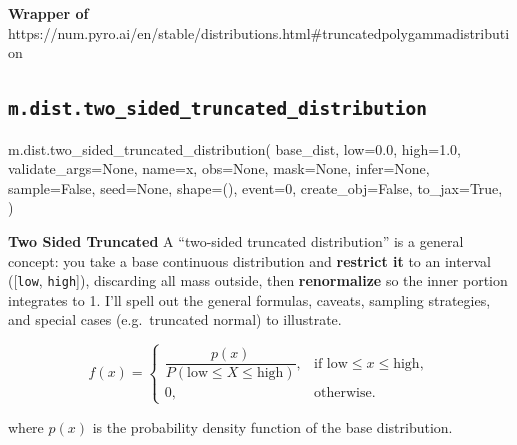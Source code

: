 \documentclass[
  letterpaper,
  DIV=11,
  numbers=noendperiod]{scrartcl}
\newenvironment{Shaded}{\begin{snugshade}}{\end{snugshade}}
\newcommand{\DecValTok}[1]{\textcolor[rgb]{0.68,0.00,0.00}{#1}}
\newcommand{\FloatTok}[1]{\textcolor[rgb]{0.68,0.00,0.00}{#1}}
\newcommand{\NormalTok}[1]{\textcolor[rgb]{0.00,0.23,0.31}{#1}}
\newcommand{\OperatorTok}[1]{\textcolor[rgb]{0.37,0.37,0.37}{#1}}
\newcommand{\StringTok}[1]{\textcolor[rgb]{0.13,0.47,0.30}{#1}}
\newcommand{\VariableTok}[1]{\textcolor[rgb]{0.07,0.07,0.07}{#1}}
\begin{document}
\textbf{Wrapper of}
https://num.pyro.ai/en/stable/distributions.html\#truncatedpolygammadistribution

\subsection{\texorpdfstring{\texttt{m.dist.two\_sided\_truncated\_distribution}}{m.dist.two\_sided\_truncated\_distribution}}\label{two_sided_truncated_distribution}

\begin{Shaded}
\begin{Highlighting}[]
\NormalTok{m.dist.two\_sided\_truncated\_distribution(}
\NormalTok{    base\_dist,}
\NormalTok{    low}\OperatorTok{=}\FloatTok{0.0}\NormalTok{,}
\NormalTok{    high}\OperatorTok{=}\FloatTok{1.0}\NormalTok{,}
\NormalTok{    validate\_args}\OperatorTok{=}\VariableTok{None}\NormalTok{,}
\NormalTok{    name}\OperatorTok{=}\StringTok{\textquotesingle{}x\textquotesingle{}}\NormalTok{,}
\NormalTok{    obs}\OperatorTok{=}\VariableTok{None}\NormalTok{,}
\NormalTok{    mask}\OperatorTok{=}\VariableTok{None}\NormalTok{,}
\NormalTok{    infer}\OperatorTok{=}\VariableTok{None}\NormalTok{,}
\NormalTok{    sample}\OperatorTok{=}\VariableTok{False}\NormalTok{,}
\NormalTok{    seed}\OperatorTok{=}\VariableTok{None}\NormalTok{,}
\NormalTok{    shape}\OperatorTok{=}\NormalTok{(),}
\NormalTok{    event}\OperatorTok{=}\DecValTok{0}\NormalTok{,}
\NormalTok{    create\_obj}\OperatorTok{=}\VariableTok{False}\NormalTok{,}
\NormalTok{    to\_jax}\OperatorTok{=}\VariableTok{True}\NormalTok{,}
\NormalTok{)}
\end{Highlighting}
\end{Shaded}

\textbf{Two Sided Truncated} A ``two-sided truncated distribution'' is a
general concept: you take a base continuous distribution and
\textbf{restrict it} to an interval ({[}\texttt{low}, \texttt{high}{]}),
discarding all mass outside, then \textbf{renormalize} so the inner
portion integrates to 1. I'll spell out the general formulas, caveats,
sampling strategies, and special cases (e.g.~truncated normal) to
illustrate.

\[
  f(x) =
  \begin{cases}
  \dfrac{p(x)}{P(\text{low} \le X \le \text{high})}, & \text{if } \text{low} \le x \le \text{high}, \\[6pt]
  0, & \text{otherwise}.
  \end{cases}
  \]

where \(p(x)\) is the probability density function of the base
distribution.
\end{document}
